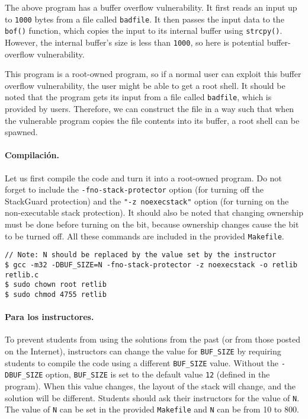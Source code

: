 The above program has a buffer overflow vulnerability. It first reads
an input up to \texttt{1000} bytes from a file called \texttt{badfile}. 
It then passes the input data to the \texttt{bof()} function, which
copies the input to its internal buffer using \texttt{strcpy()}. 
However, the internal buffer's size is less than \texttt{1000},
so here is potential buffer-overflow vulnerability.

This program is a root-owned \setuid program, so if a normal user can exploit this buffer
overflow vulnerability, the user might be able to get a root
shell.  It should be noted that the program gets its input from a file
called \texttt{badfile}, which is provided by users. Therefore, we can
construct the file in a way such that when
the vulnerable program copies the file contents into its buffer, a root
shell can be spawned.

\vspace{0.1in}
\paragraph{Compilación.} 
Let us first compile the code and turn it into a root-owned \setuid
program. Do not forget to include the 
\texttt{-fno-stack-protector} option (for turning off the StackGuard
protection) and the \texttt{"-z noexecstack"} option (for turning on
the non-executable stack protection). 
It should also be noted that changing ownership must be done before
turning on the \setuid bit, 
because ownership changes cause the \setuid bit to be turned off.
All these commands are included in the provided \texttt{Makefile}. 


\begin{lstlisting}
// Note: N should be replaced by the value set by the instructor
$ gcc -m32 -DBUF_SIZE=N -fno-stack-protector -z noexecstack -o retlib retlib.c
$ sudo chown root retlib           
$ sudo chmod 4755 retlib           
\end{lstlisting}


\paragraph{Para los instructores.}
To prevent students from using the solutions from the past (or from those
posted on the Internet), instructors can change the
value for \texttt{BUF\_SIZE} by requiring students to compile the
code using a different \texttt{BUF\_SIZE} value.
Without the \texttt{-DBUF\_SIZE}
option, \texttt{BUF\_SIZE} is set to the default value \texttt{12} (defined
in the program).
When this value changes, the layout of the stack
will change, and the solution will be different.
Students should ask their instructors for
the value of \texttt{N}. The value of \texttt{N} can be set 
in the provided \texttt{Makefile} and \texttt{N} can be 
from 10 to 800.



